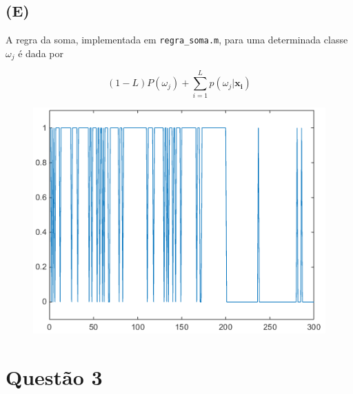 \documentclass[12pt,twoside]{report}
\newcommand{\code}[1]{\texttt{#1}}
\begin{document}
\section*{(E)}

A regra da soma, implementada em \code{regra\_soma.m}, para uma determinada classe
$\omega_j$ é dada por

\begin{equation}
(1 - L) P(\omega_j) + \sum_{i=1}^L p(\omega_j|\mathbf{x_i})
\label{eq:sum_prob_posteriori}
\end{equation}

\begin{figure}[H]
    \centering
    \includegraphics[scale=0.5]{sum_rule}
    \caption{}
    \label{fig:sum_rule}
\end{figure}


\chapter*{Questão 3}


\printbibliography
\end{document}
